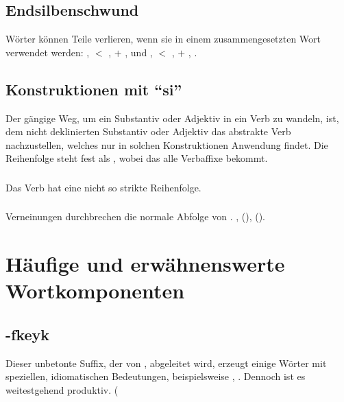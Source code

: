 \subsection{Endsilbenschwund} W\"orter k\"onnen Teile verlieren, wenn sie in einem
zusammengesetzten Wort verwendet werden: ,  $<$ ,
 $+$ ,  und ,  $<$
,  $+$ , .


\subsection{Konstruktionen mit "`si"'} Der g\"angige Weg, um ein Substantiv oder Adjektiv
in ein Verb zu wandeln, ist, dem nicht deklinierten Substantiv oder Adjektiv das abstrakte Verb
 nachzustellen, welches nur in solchen Konstruktionen Anwendung findet. Die Reihenfolge
steht fest als , wobei das  alle Verbaffixe bekommt.\label{lingop:si-const}

\subsubsection{} Das Verb  hat eine nicht so strikte Reihenfolge.

\subsubsection{} Verneinungen durchbrechen die normale Abfolge von . ,  (),   ().


\section{H\"aufige und erw\"ahnenswerte Wortkomponenten}

\subsection{-fkeyk} Dieser unbetonte Suffix, der von , 
abgeleitet wird, erzeugt einige W\"orter mit speziellen, idiomatischen Bedeutungen,
beispielsweise , . Dennoch ist es weitestgehend produktiv.
( 

